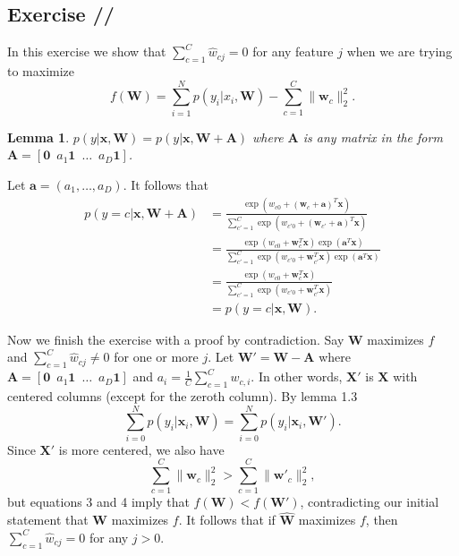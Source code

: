 \documentclass[a4paper,11pt]{article}
\theoremstyle{plain}
\newcounter{exercise}
\newcounter{subexercise}
\newcommand*{\exercise}[1][]{\subsection*{Exercise \ifx/#1/\stepcounter{exercise}\arabic{exercise}\else#1\fi}\setcounter{subexercise}{0}}
\newtheorem{lemma}[theorem]{Lemma}
\begin{document}
\setcounter{exercise}{4}
\exercise
In this exercise we show that $\sum_{c=1}^{C}\hat{w}_{cj}=0$ for
any feature $j$ when we are trying to maximize
\[
    f(\mathbf{W})=\sum \limits_{i=1}^{N}p(y_i|x_i, \mathbf{W})
    -\sum \limits_{c=1}^{C}\lVert \mathbf{w}_c\rVert_2^2.
\]  
\begin{lemma}
    $p(y|\mathbf{x}, \mathbf{W}) = p(y|\mathbf{x}, \mathbf{W}+\mathbf{A})$ where $\mathbf{A}$
    is any matrix in the form $\mathbf{A}=
    [\mathbf{0}\enspace a_{1}\mathbf{1}\enspace\dots\enspace a_D\mathbf{1}]$.
\end{lemma}
Let $\mathbf{a} = (a_{1}, \dots, a_D)$. It follows that
\begin{align*}
    p(y=c|\mathbf{x}, \mathbf{W}+\mathbf{A}) &=
    \frac{\exp(w_{c0} + (\mathbf{w}_{c} + \mathbf{a})^{T}\mathbf{x})}
    {\sum_{c'=1}^{C}\exp(w_{c'0} + (\mathbf{w}_{c'} + \mathbf{a})^{T}\mathbf{x})} \\
    &= \frac{\exp(w_{c0} + \mathbf{w}_{c}^{T}\mathbf{x})\exp(\mathbf{a}^{T}\mathbf{x})}
    {\sum_{c'=1}^{C}\exp(w_{c'0} +
    \mathbf{w}_{c'}^{T}\mathbf{x})\exp(\mathbf{a}^{T}\mathbf{x})}\\
    &= \frac{\exp(w_{c0} + \mathbf{w}_{c}^{T}\mathbf{x})}
    {\sum_{c'=1}^{C}\exp(w_{c'0} + \mathbf{w}_{c'}^{T}\mathbf{x})} \\
    &= p(y=c|\mathbf{x}, \mathbf{W}).
\end{align*}

Now we finish the exercise with a proof by contradiction.
Say $\mathbf{W}$ maximizes $f$ and
$\sum_{c=1}^{C}\hat{w}_{cj}\neq 0$ for one or more $j$. Let
$\mathbf{W}' = \mathbf{W}- \mathbf{A}$ where $\mathbf{A} = [\mathbf{0}
\enspace a_{1}\mathbf{1} \enspace \dots \enspace a_D\mathbf{1}]$ and $a_i 
=\frac{1}{C}\sum_{c=1}^{C}w_{c,i}$. In other words, $\mathbf{X}'$ is $\mathbf{X}$ 
with centered columns (except for the zeroth column). By lemma 1.3
\begin{equation}
    \sum \limits_{i=0}^{N}p(y_i|\mathbf{x}_i, \mathbf{W}) =
    \sum \limits_{i=0}^{N}p(y_i|\mathbf{x}_i, \mathbf{W}').
\end{equation}
Since $\mathbf{X}'$ is more centered, we also have
\begin{equation}
    \sum \limits_{c=1}^{C} \lVert \mathbf{w}_c \rVert_2^2 >
    \sum \limits_{c=1}^{C} \lVert \mathbf{w}'_c \rVert_2^2,
\end{equation}
but equations 3 and 4 imply that $f(\mathbf{W})<f(\mathbf{W}')$, contradicting
our initial statement that $\mathbf{W}$ maximizes $f$. It follows that
if  $\hat{\mathbf{W}}$ maximizes $f$, then $\sum_{c=1}^{C}\hat{w}_{cj}=0$ for any $j>0$.
\end{document}
